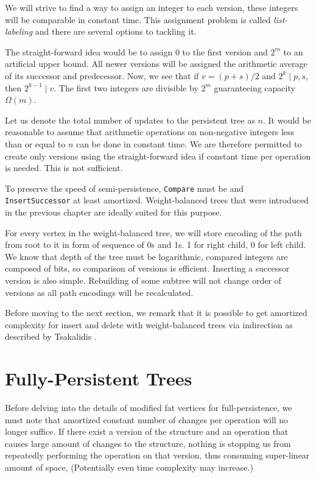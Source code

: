 We will strive to find a way to assign an integer to each version, these integers will be comparable in constant time. This assignment problem is called \emph{list-labeling} and there are several options to tackling it.

The straight-forward idea would be to assign 0 to the first version and $2^m$ to an artificial upper bound. All newer versions will be assigned the arithmetic average of its successor and predecessor. Now, we see that if $v = (p + s)/2$ and $ 2^k \mid p, s$, then $2^{k-1} \mid v$. The first two integers are divisible by $2^m$ guaranteeing capacity $\Omega(m)$. 

Let us denote the total number of updates to the persistent tree as $n$. It would be reasonable to  assume that arithmetic operations on non-negative integers less than or equal to $n$ can be done in constant time. We are therefore permitted to create only  versions using the straight-forward idea if constant time per operation is needed. This is not sufficient.

To preserve the speed of semi-persistence, \texttt{Compare} must be  and \texttt{InsertSuccessor}  at least amortized. Weight-balanced trees that were introduced in the previous chapter are ideally suited for this purpose.

For every vertex in the weight-balanced tree, we will store encoding of the path from root to it in form of sequence of 0s and 1s. 1 for right child, 0 for left child. We know that depth of the tree must be logarithmic, compared integers are composed of  bits, so comparison of versions is efficient. Inserting a successor version is also simple. Rebuilding of some subtree will not change order of versions as all path encodings will be recalculated.

Before moving to the next section, we remark that it is possible to get  amortized complexity for insert and delete with weight-balanced trees via indirection as described by Tsakalidis \cite{list-ordering}.

\section{Fully-Persistent Trees}

Before delving into the details of modified fat vertices for full-persistence, we must note that amortized constant number of changes per operation will no longer suffice. If there exist a version of the structure and an operation that causes large amount of changes to the structure, nothing is stopping us from repeatedly performing the operation on that version, thus consuming super-linear amount of space, (Potentially even time complexity may increase.)

